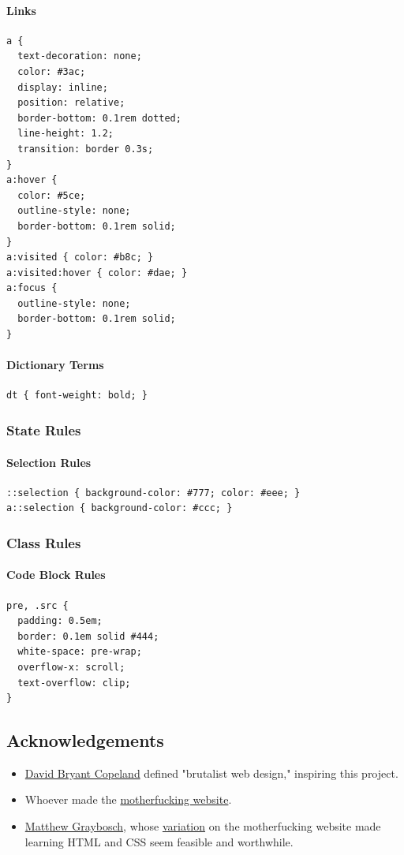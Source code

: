 \documentclass[11pt]{article}
\begin{document}
\paragraph*{Links}
\label{sec:orgd756234}
\begin{verbatim}
a {
  text-decoration: none;
  color: #3ac;
  display: inline;
  position: relative;
  border-bottom: 0.1rem dotted;
  line-height: 1.2;
  transition: border 0.3s;
}
a:hover {
  color: #5ce;
  outline-style: none;
  border-bottom: 0.1rem solid;
}
a:visited { color: #b8c; }
a:visited:hover { color: #dae; }
a:focus {
  outline-style: none;
  border-bottom: 0.1rem solid;
}
\end{verbatim}
\paragraph*{Dictionary Terms}
\label{sec:orgbcd4840}
\begin{verbatim}
dt { font-weight: bold; }
\end{verbatim}
\subsubsection*{State Rules}
\label{sec:orgcf4cd60}
\paragraph*{Selection Rules}
\label{sec:org754b541}
\begin{verbatim}
::selection { background-color: #777; color: #eee; }
a::selection { background-color: #ccc; }
\end{verbatim}
\subsubsection*{Class Rules}
\label{sec:org703e46a}
\paragraph*{Code Block Rules}
\label{sec:orgac4dbab}
\begin{verbatim}
pre, .src {
  padding: 0.5em;
  border: 0.1em solid #444;
  white-space: pre-wrap;
  overflow-x: scroll;
  text-overflow: clip;
}
\end{verbatim}
\subsection*{Acknowledgements}
\label{sec:orgf4c8017}
\begin{itemize}
\item \href{https://naildrivin4.com}{David Bryant Copeland} defined "brutalist web design," inspiring this
project.
\item Whoever made the \href{https://motherfuckingwebsite.com}{motherfucking website}.
\item \href{https://www.matthewgraybosch.com}{Matthew Graybosch}, whose \href{https://codepen.io/demifiend/pen/EENKNN}{variation} on the motherfucking website made
learning HTML and CSS seem feasible and worthwhile.
\end{itemize}
\end{document}
